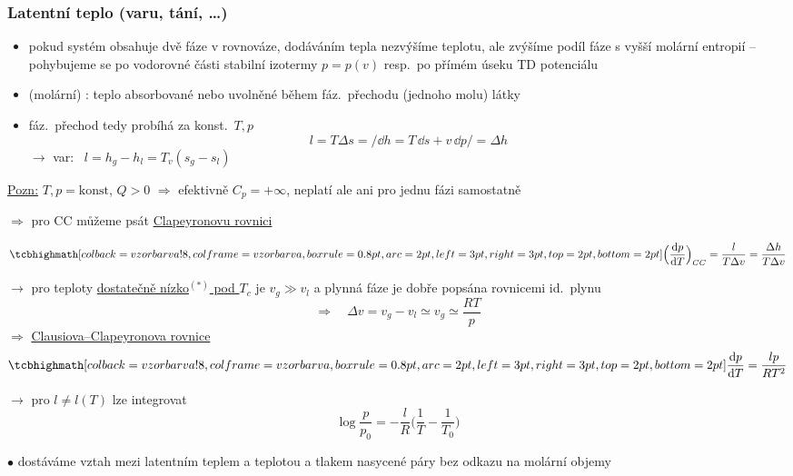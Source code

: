 \subsubsection*{Latentní teplo (varu, tání, \dots)}
\begin{itemize}
  \item pokud systém obsahuje dvě fáze v rovnováze, dodáváním tepla nezvýšíme teplotu, ale zvýšíme podíl fáze s vyšší molární entropií -- pohybujeme se po vodorovné části stabilní izotermy $p = p(v)$ resp.\ po přímém úseku TD potenciálu
  \item (molární) : teplo absorbované nebo uvolněné během fáz.\ přechodu (jednoho molu) látky
\end{itemize}

\begin{itemize}
  \item fáz.\ přechod tedy probíhá za konst.\ $T,p$
  \[ l = T\Delta s = /\dd h = T\,\dd s + v\,\dd p/ = \Delta h \]
  $\to$ var: \ $l = h_g - h_l = T_v(s_g - s_l)$
\end{itemize}
\underline{Pozn:} $T,p = \text{konst}$, $Q > 0$ $\Rightarrow$ efektivně $C_p = +\infty$, neplatí ale ani pro jednu fázi samostatně

$\Rightarrow$ pro CC můžeme psát \underline{Clapeyronovu rovnici}
\begin{veta}
\[ \vzorec{\Big(\frac{\dd p}{\dd T}\Big)_{CC} = \frac{l}{T\Delta v} = \frac{\Delta h}{T\Delta v}} \]
\end{veta}

\begin{priklad}
$\to$ pro teploty \underline{dostatečně nízko$^{(*)}$ pod $T_c$} je $v_g \gg v_l$ a plynná fáze je dobře popsána rovnicemi id.\ plynu
\[ \Rightarrow\quad \Delta v = v_g - v_l \simeq v_g \simeq \frac{RT}{p} \]
$\Rightarrow$ \underline{Clausiova--Clapeyronova rovnice}
\[ \vzorec{\frac{\dd p}{\dd T} = \frac{lp}{RT^2}} \]
\begin{minipage}{0.45\textwidth}
$\to$ pro $l \neq l(T)$ lze integrovat
\[ \log\frac{p}{p_0} = -\frac{l}{R}\Big(\frac1T - \frac1{T_0}\Big) \]
\end{minipage}
\begin{minipage}{0.5\textwidth}
$\bullet$ dostáváme vztah mezi latentním teplem a teplotou a tlakem nasycené páry bez odkazu na molární objemy
\end{minipage}
\end{priklad}

